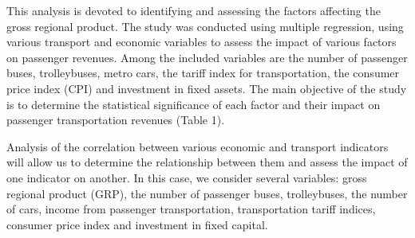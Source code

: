 \begin{multicols}{2}
This analysis is devoted to identifying and assessing the factors
affecting the gross regional product. The study was conducted using
multiple regression, using various transport and economic variables to
assess the impact of various factors on passenger revenues. Among the
included variables are the number of passenger buses, trolleybuses,
metro cars, the tariff index for transportation, the consumer price
index (CPI) and investment in fixed assets. The main objective of the
study is to determine the statistical significance of each factor and
their impact on passenger transportation revenues (Table 1).

Analysis of the correlation between various economic and transport
indicators will allow us to determine the relationship between them and
assess the impact of one indicator on another. In this case, we consider
several variables: gross regional product (GRP), the number of passenger
buses, trolleybuses, the number of cars, income from passenger
transportation, transportation tariff indices, consumer price index and
investment in fixed capital.
\end{multicols}

